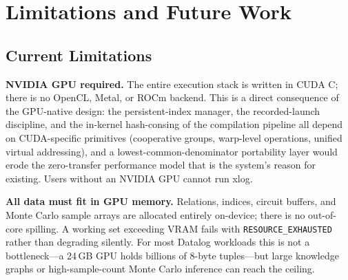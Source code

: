 \section{Limitations and Future Work}\label{sec:limits}

\subsection{Current Limitations}

\textbf{NVIDIA GPU required.} The entire execution stack is written in CUDA C; there is no OpenCL, Metal, or ROCm backend. This is a direct consequence of the GPU-native design: the persistent-index manager, the recorded-launch discipline, and the in-kernel hash-consing of the compilation pipeline all depend on CUDA-specific primitives (cooperative groups, warp-level operations, unified virtual addressing), and a lowest-common-denominator portability layer would erode the zero-transfer performance model that is the system's reason for existing. Users without an NVIDIA GPU cannot run xlog.

\textbf{All data must fit in GPU memory.} Relations, indices, circuit buffers, and Monte Carlo sample arrays are allocated entirely on-device; there is no out-of-core spilling. A working set exceeding VRAM fails with \texttt{RESOURCE\_EXHAUSTED} rather than degrading silently. For most Datalog workloads this is not a bottleneck---a 24\,GB GPU holds billions of 8-byte tuples---but large knowledge graphs or high-sample-count Monte Carlo inference can reach the ceiling.

